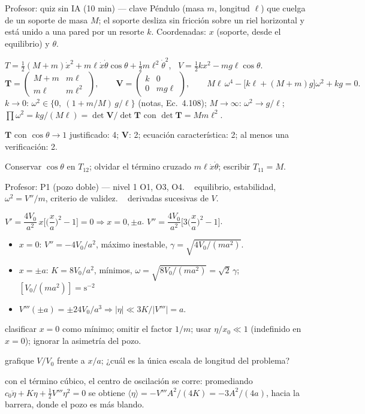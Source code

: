 \documentclass[spanish]{beamer}
\newcommand{\Tm}{\mathbf{T}}              %
\newcommand{\Vm}{\mathbf{V}}              %
\begin{document}
\begin{frame}{Profesor: quiz sin IA (10 min) --- clave}
\scriptsize
{} Péndulo (masa $m$, longitud $\ell$) que cuelga de un soporte de masa $M$; el soporte desliza sin fricción sobre un riel horizontal y está unido a una pared por un resorte $k$. Coordenadas: $x$ (soporte, desde el equilibrio) y $\theta$.

 $T=\tfrac12(M+m)\dot x^2+m\ell\dot x\dot\theta\cos\theta+\tfrac12m\ell^2\dot\theta^2$, \ $V=\tfrac12kx^2-mg\ell\cos\theta$.
\[
\Tm=\begin{pmatrix}M+m&m\ell\\ m\ell&m\ell^2\end{pmatrix},\qquad
\Vm=\begin{pmatrix}k&0\\0&mg\ell\end{pmatrix},\qquad
M\ell\,\omega^4-\big[k\ell+(M+m)g\big]\omega^2+kg=0 .
\]
 $k\to0$: $\omega^2\in\{0,\ (1+m/M)\,g/\ell\}$ (notas, Ec.~4.108); $M\to\infty$: $\omega^2\to g/\ell$; $\prod\omega^2=kg/(M\ell)=\det\Vm/\det\Tm$ con $\det\Tm=Mm\ell^2$.

 $\Tm$ con $\cos\theta\to1$ justificado: 4; $\Vm$: 2; ecuación característica: 2; al menos una verificación: 2.

 Conservar $\cos\theta$ en $T_{12}$; olvidar el término cruzado $m\ell\dot x\dot\theta$; escribir $T_{11}=M$.
\end{frame}

\begin{frame}{Profesor: P1 (pozo doble) --- nivel 1}
\scriptsize
{} O1, O3, O4. \  equilibrio, estabilidad, $\omega^2=V''/m$, criterio de validez. \  derivadas sucesivas de $V$.

 $V'=\dfrac{4V_0}{a^2}\,x\Big[\Big(\dfrac{x}{a}\Big)^2-1\Big]=0\Rightarrow x=0,\pm a$. \quad $V''=\dfrac{4V_0}{a^2}\Big[3\Big(\dfrac{x}{a}\Big)^2-1\Big]$.
\begin{itemize}
\item $x=0$: $V''=-4V_0/a^2$, máximo inestable, $\gamma=\sqrt{4V_0/(ma^2)}$.
\item $x=\pm a$: $K=8V_0/a^2$, mínimos, $\omega=\sqrt{8V_0/(ma^2)}=\sqrt2\,\gamma$; $[V_0/(ma^2)]=\mathrm{s}^{-2}$ \checkmark
\item $V'''(\pm a)=\pm24V_0/a^3\Rightarrow|\eta|\ll3K/|V'''|=a$.
\end{itemize}
 clasificar $x=0$ como mínimo; omitir el factor $1/m$; usar $\eta/x_0\ll1$ (indefinido en $x=0$); ignorar la asimetría del pozo.

 grafique $V/V_0$ frente a $x/a$; ¿cuál es la única escala de longitud del problema?

 con el término cúbico, el centro de oscilación se corre: promediando $c_0\ddot\eta+K\eta+\tfrac12V'''\eta^2=0$ se obtiene $\langle\eta\rangle=-V'''A^2/(4K)=-3A^2/(4a)$, hacia la barrera, donde el pozo es más blando.
\end{frame}
\end{document}
